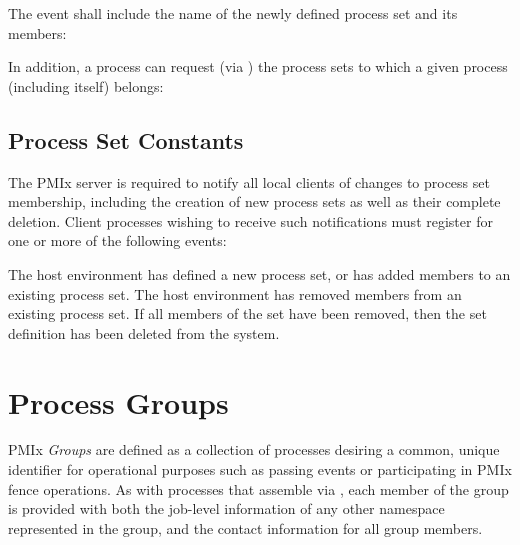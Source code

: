 \vspace{\baselineskip}
The  event shall include the name of the newly defined process set and its members:
%
%

\vspace{\baselineskip}
In addition, a process can request (via ) the process sets to which a given process (including itself) belongs:

%

\subsection{Process Set Constants}

The \ac{PMIx} server is required to notify all local clients of changes to
process set membership, including the creation of new process sets as well as
their complete deletion. Client processes wishing to receive such
notifications must register for one or more of the following events:

\begin{constantdesc}
%
The host environment has defined a new process set, or has added members to
an existing process set.
%
The host environment has removed members from an existing process set. If all
members of the set have been removed, then the set definition has been
deleted from the system.
%
\end{constantdesc}


\section{Process Groups}
\label{chap:api_sets_groups:groups}

\ac{PMIx} \emph{Groups} are defined as a collection of processes desiring a common, unique identifier for operational purposes such as passing events or participating in \ac{PMIx} fence operations. As with processes that assemble via , each member of the group is provided with both the job-level information of any other namespace represented in the group, and the contact information for all group members.

